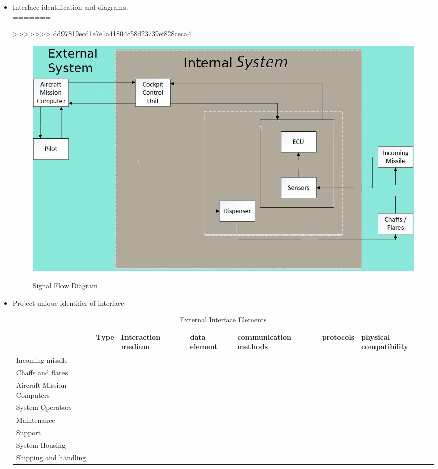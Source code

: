 \begin{itemize}
\item {Interface identification and diagrams.}\\
=======

>>>>>>> dd97819ecd1e7e1a41804c58d23739ef828ceca4
\begin{figure}[h]
	\centering
	\includegraphics[scale=0.5]{./images/SignalFlowDiagramDDD}\\
	\caption{Signal Flow Diagram}
    \label{fig:sigFlowDiagram}
\end{figure}

\item {Project-unique identifier of interface}\\
\begin{table}
\begin{tabular}{ l l l l l l l }
\hline
&Type&Interaction medium&data element&communication methods&protocols&physical compatibility\\
\hline
Incoming missile&&&&&&\\
\hline
Chaffs and flares&&&&&&\\
\hline
Aircraft Mission Computers&&&&&&\\
\hline
System Operators&&&&&&\\
\hline
Maintenance&&&&&&\\
\hline
Support&&&&&&\\
\hline
System Housing&&&&&&\\
\hline
Shipping and handling&&&&&&\\
\hline
\end{tabular}
\caption{External Interface Elements}
\end{table}
\end{itemize}

